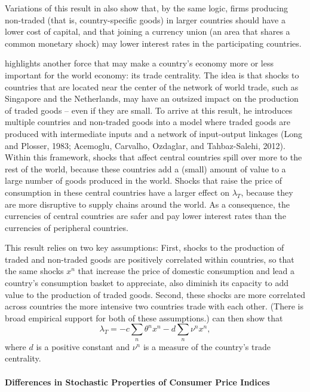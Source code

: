 \documentclass{ar-1col}
\begin{document}
Variations of this result in \citet{Hassan2013} also show that, by the same logic, firms producing non-traded (that is, country-specific goods) in larger countries should have a lower cost of capital, and that joining a currency union (an area that shares a common monetary shock) may lower interest rates in the participating countries.

\citet{Richmond2019} highlights another force that may make a country's economy more or less important for the world economy: its trade centrality. The idea is that shocks to countries that are located near the center of the network of world trade, such as Singapore and the Netherlands, may have an outsized impact on the production of traded goods -- even if they are small. To arrive at this result, he introduces multiple countries and non-traded goods into a model where traded goods are produced with intermediate inputs and a network of input-output linkages (Long and Plosser, 1983; Acemoglu, Carvalho, Ozdaglar, and Tahbaz-Salehi, 2012). Within this framework, shocks that affect central countries spill over more to the rest of the world, because these countries add a (small) amount of value to a large number of goods produced in the world. Shocks that raise the price of consumption in these central countries have a larger effect on  $\lambda_T$, because they are more disruptive to supply chains around the world. As a consequence, the currencies of central countries are safer and pay lower interest rates than the currencies of peripheral countries.   

This result relies on two key assumptions: First, shocks to the production of traded and non-traded goods are positively correlated within countries, so that the same shocks $x^n$ that increase the price of domestic consumption and lead a country's consumption basket to appreciate, also diminish its capacity to add value to the production of traded goods. Second, these shocks are more correlated across countries the more intensive two countries trade with each other. (There is broad empirical support for both of these assumptions.) \citet{Richmond2019} can then show that $$\lambda_{T} = -c \sum_{n} \theta^n x^n- d\sum_{n} \nu^n x^n,$$ where $d$ is a positive constant and $\nu^n$ is a measure of the country's trade centrality.

\paragraph*{Differences in Stochastic Properties of Consumer Price Indices}
\end{document}
